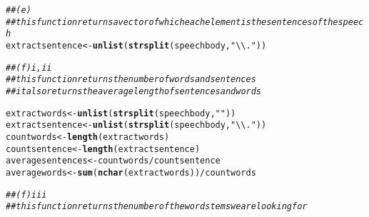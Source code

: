\documentclass[english]{article}\usepackage[]{graphicx}\usepackage[]{color}
\makeatletter
\newcommand{\hlstr}[1]{\textcolor[rgb]{0.192,0.494,0.8}{#1}}%
\newcommand{\hlcom}[1]{\textcolor[rgb]{0.678,0.584,0.686}{\textit{#1}}}%
\newcommand{\hlopt}[1]{\textcolor[rgb]{0,0,0}{#1}}%
\newcommand{\hlstd}[1]{\textcolor[rgb]{0.345,0.345,0.345}{#1}}%
\newcommand{\hlkwb}[1]{\textcolor[rgb]{0.69,0.353,0.396}{#1}}%
\newcommand{\hlkwd}[1]{\textcolor[rgb]{0.737,0.353,0.396}{\textbf{#1}}}%
\newenvironment{kframe}{%
 \def\at@end@of@kframe{}%
 \ifinner\ifhmode%
  \def\at@end@of@kframe{\end{minipage}}%
  \begin{minipage}{\columnwidth}%
 \fi\fi%
 \def\FrameCommand##1{\hskip\@totalleftmargin \hskip-\fboxsep
 \colorbox{shadecolor}{##1}\hskip-\fboxsep
     \hskip-\linewidth \hskip-\@totalleftmargin \hskip\columnwidth}%
 \MakeFramed {\advance\hsize-\width
   \@totalleftmargin\z@ \linewidth\hsize
   \@setminipage}}%
 {\par\unskip\endMakeFramed%
 \at@end@of@kframe}
\newenvironment{knitrout}{}{} %
\makeatother
\begin{document}
\begin{knitrout}
\begin{kframe}
\begin{alltt}
\hlcom{## (e) }
\hlcom{## this function returns a vector of which each element is the sentences of the speech}
    \hlstd{extractsentence} \hlkwb{<-} \hlkwd{unlist}\hlstd{(}\hlkwd{strsplit}\hlstd{(speechbody,}\hlstr{"\textbackslash{}\textbackslash{}."}\hlstd{))}

\hlcom{## (f) i,ii}
\hlcom{## this function returns the number of words and sentences}
\hlcom{## it also returns the average length of sentences and words}

        \hlstd{extractwords} \hlkwb{<-} \hlkwd{unlist}\hlstd{(}\hlkwd{strsplit}\hlstd{(speechbody,}\hlstr{" "}\hlstd{))}
        \hlstd{extractsentence} \hlkwb{<-} \hlkwd{unlist}\hlstd{(}\hlkwd{strsplit}\hlstd{(speechbody,}\hlstr{"\textbackslash{}\textbackslash{}."}\hlstd{))}
        \hlstd{countwords} \hlkwb{<-} \hlkwd{length}\hlstd{(extractwords)}
        \hlstd{countsentence} \hlkwb{<-} \hlkwd{length}\hlstd{(extractsentence)}
        \hlstd{averagesentences} \hlkwb{<-} \hlstd{countwords}\hlopt{/}\hlstd{countsentence}
        \hlstd{averagewords} \hlkwb{<-} \hlkwd{sum}\hlstd{(}\hlkwd{nchar}\hlstd{(extractwords))}\hlopt{/}\hlstd{countwords}

\hlcom{## (f) iii}
\hlcom{## this function returns the number of the word stems we are looking for}


\end{alltt}
\end{kframe}
\end{knitrout}
\end{document}
